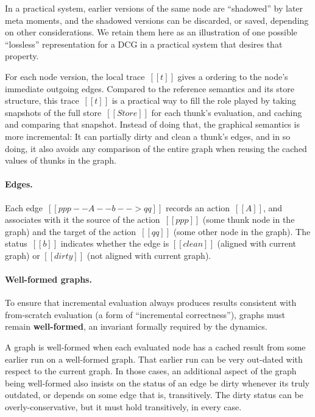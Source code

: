 \documentclass[11pt]{article}
\begin{document}
In a practical system, earlier versions of the same node are
``shadowed'' by later meta moments, and the shadowed versions can be
discarded, or saved, depending on other considerations.
%
We retain them here as an illustration of one possible ``lossless'' representation for a DCG in a practical system that desires that property.

For each node version, the local trace~$[[t]]$ gives a ordering to the node's immediate outgoing edges.
%
Compared to the reference semantics and its store structure, this
trace~$[[t]]$ is a practical way to fill the role played by taking
snapshots of the full store~$[[Store]]$ for each thunk's evaluation,
and caching and comparing that snapshot.
%
Instead of doing that, the graphical semantics is more incremental:
It can partially dirty and clean a thunk's edges, and in so doing, it also avoids any comparison of the entire graph
when reusing the cached values of thunks in the graph.

\ottgrammartabular{
  \ottnode
  \\
  \ottcache
  \\
  \ottt
}

\paragraph{Edges.}
Each edge~$[[ppp --A--b--> qq]]$ records an action~$[[A]]$, and
associates with it the source of the action~$[[ppp]]$ (some thunk node
in the graph) and the target of the action~$[[qq]]$ (some other node
in the graph).
%
The status~$[[b]]$ indicates whether the edge is $[[clean]]$ (aligned
with current graph) or $[[dirty]]$ (not aligned with current graph).

\ottgrammartabular{
  \ottedge
  \\
  \ottA
  \\
  \ottb
}


\paragraph{Well-formed graphs.}
To ensure that incremental evaluation always produces results
consistent with from-scratch evaluation (a form of ``incremental
correctness''), graphs must remain \textbf{well-formed}, an invariant
formally required by the dynamics.

A graph is well-formed when each evaluated node has a cached result
from some earlier run on a well-formed graph.
%
That earlier run can be very out-dated with respect to the current graph.
%
In those cases, an additional aspect of the graph being well-formed
also insists on the status of an edge be dirty whenever its truly
outdated, or depends on some edge that is, transitively.
%
The dirty status can be overly-conservative, but it must hold
transitively, in every case.
\end{document}
